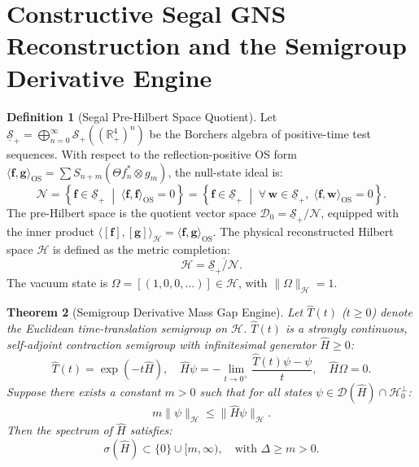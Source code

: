 \documentclass[11pt,reqno]{amsart}
\theoremstyle{plain}
\newtheorem{theorem}{Theorem}[section]
\theoremstyle{definition}
\newtheorem{definition}[theorem]{Definition}
\theoremstyle{remark}
\numberwithin{equation}{section}
\begin{document}
\section{Constructive Segal GNS Reconstruction and the Semigroup Derivative Engine}
\label{sec:gns}

\begin{definition}[Segal Pre-Hilbert Space Quotient]
Let $\underline{\mathcal{S}}_+ = \bigoplus_{n=0}^\infty \mathcal{S}_+((\mathbb{R}_+^4)^n)$ be the Borchers algebra of positive-time test sequences. With respect to the reflection-positive OS form $\langle \mathbf{f}, \mathbf{g} \rangle_{\mathrm{OS}} = \sum S_{n+m}(\Theta f_n^* \otimes g_m)$, the null-state ideal is:
\begin{equation}
\mathcal{N} = \left\{ \mathbf{f} \in \underline{\mathcal{S}}_+ \;\middle|\; \langle \mathbf{f}, \mathbf{f} \rangle_{\mathrm{OS}} = 0 \right\} = \left\{ \mathbf{f} \in \underline{\mathcal{S}}_+ \;\middle|\; \forall \, \mathbf{w} \in \underline{\mathcal{S}}_+, \; \langle \mathbf{f}, \mathbf{w} \rangle_{\mathrm{OS}} = 0 \right\}.
\end{equation}
The pre-Hilbert space is the quotient vector space $\mathcal{D}_0 = \underline{\mathcal{S}}_+ / \mathcal{N}$, equipped with the inner product $\langle [\mathbf{f}], [\mathbf{g}] \rangle_{\mathcal{H}} = \langle \mathbf{f}, \mathbf{g} \rangle_{\mathrm{OS}}$. The physical reconstructed Hilbert space $\mathcal{H}$ is defined as the metric completion:
\begin{equation}
\mathcal{H} = \overline{\underline{\mathcal{S}}_+ / \mathcal{N}}.
\end{equation}
The vacuum state is $\Omega = [(1, 0, 0, \dots)] \in \mathcal{H}$, with $\|\Omega\|_{\mathcal{H}} = 1$.
\end{definition}

\begin{theorem}[Semigroup Derivative Mass Gap Engine]
\label{thm:semigroup_engine}
Let $\hat{T}(t)$ ($t \ge 0$) denote the Euclidean time-translation semigroup on $\mathcal{H}$. $\hat{T}(t)$ is a strongly continuous, self-adjoint contraction semigroup with infinitesimal generator $\hat{H} \ge 0$:
\begin{equation}
\hat{T}(t) = \exp(-t \hat{H}), \quad \hat{H} \psi = -\lim_{t \to 0^+} \frac{\hat{T}(t)\psi - \psi}{t}, \quad \hat{H}\Omega = 0.
\end{equation}
Suppose there exists a constant $m > 0$ such that for all states $\psi \in \mathcal{D}(\hat{H}) \cap \mathcal{H}_0^\perp$:
\begin{equation}
\label{eq:generator_bound}
m \|\psi\|_{\mathcal{H}} \le \|\hat{H} \psi\|_{\mathcal{H}}.
\end{equation}
Then the spectrum of $\hat{H}$ satisfies:
\begin{equation}
\sigma(\hat{H}) \subset \{0\} \cup [m, \infty), \quad \text{with } \Delta \ge m > 0.
\end{equation}
\end{theorem}
\end{document}
